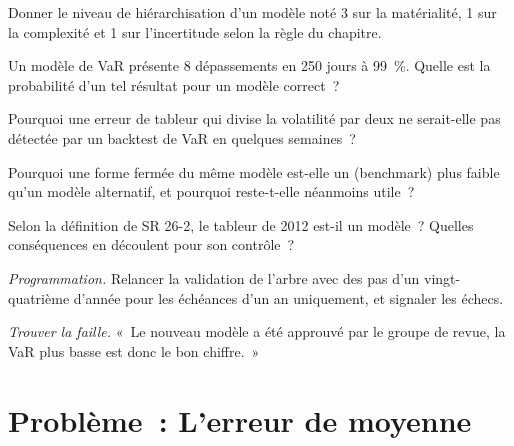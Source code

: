 \begin{exercise}[$\star$]\label{exo:rc:model-risk-and-validation:2}
Donner le niveau de hiérarchisation d'un modèle noté 3 sur la matérialité, 1 sur la complexité et 1 sur
l'incertitude selon la règle du chapitre.
\end{exercise}

\begin{exercise}[$\star$]\label{exo:rc:model-risk-and-validation:3}
Un modèle de VaR présente 8 dépassements en 250 jours à 99~\%. Quelle est la probabilité d'un tel résultat pour un modèle correct~?
\end{exercise}

\begin{exercise}[$\star\star$]\label{exo:rc:model-risk-and-validation:4}
Pourquoi une erreur de tableur qui divise la volatilité par deux ne serait-elle pas détectée par un backtest de VaR en quelques semaines~?
\end{exercise}

\begin{exercise}[$\star\star$]\label{exo:rc:model-risk-and-validation:5}
Pourquoi une forme fermée du même modèle est-elle un  (benchmark) plus faible qu'un modèle alternatif, et pourquoi reste-t-elle
néanmoins utile~?
\end{exercise}

\begin{exercise}[$\star\star$]\label{exo:rc:model-risk-and-validation:6}
Selon la définition de SR 26-2, le tableur de 2012 est-il un modèle~? Quelles conséquences en découlent pour son contrôle~?
\end{exercise}

\begin{exercise}[$\star\star\star$]\label{exo:rc:model-risk-and-validation:7}
\emph{Programmation.} Relancer la validation de l'arbre avec des pas d'un vingt-quatrième d'année pour les
échéances d'un an uniquement, et signaler les échecs.
\end{exercise}

\begin{exercise}[$\star\star\star$]\label{exo:rc:model-risk-and-validation:8}
\emph{Trouver la faille.} «~Le nouveau modèle a été approuvé par le groupe de revue, la VaR plus basse est donc le bon
chiffre.~»
\end{exercise}

\section{Problème~: L'erreur de moyenne}

